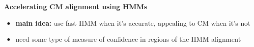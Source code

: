 \documentclass[landscape]{slides}
\begin{document}
\begin{slide}
\begin{center}

\textbf{Accelerating CM alignment using HMMs}
\end{center}
\medskip
\begin{minipage}{6in}
\footnotesize
\begin{itemize}
\item
\textbf{main idea:} use fast HMM when it's accurate, appealing to CM when it's not
\item
need some type of measure of confidence in regions of the HMM alignment


\end{itemize}
\end{minipage}
\end{slide}
\end{document}
